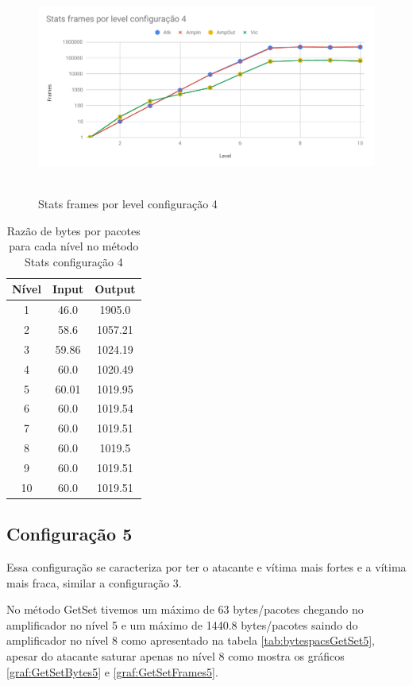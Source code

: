 \begin{figure}[H]
     \centering
     \label{graf:StatsFrames4}
     \includegraphics[scale=0.6]{img/capturas/StatsFLC4.pdf}\
     \caption{Stats frames por level configuração 4}
\end{figure}

\begin{table}[H]
\centering
\label{tab:bytespacsStats4}
\caption{Razão de bytes por pacotes para cada nível no método Stats configuração 4}
\begin{tabular}{|c|c|c|}
\hline
Nível & Input & Output  \\ \hline
1     & 46.0  & 1905.0  \\ \hline
2     & 58.6  & 1057.21 \\ \hline
3     & 59.86 & 1024.19 \\ \hline
4     & 60.0  & 1020.49 \\ \hline
5     & 60.01 & 1019.95 \\ \hline
6     & 60.0  & 1019.54 \\ \hline
7     & 60.0  & 1019.51 \\ \hline
8     & 60.0  & 1019.5  \\ \hline
9     & 60.0  & 1019.51 \\ \hline
10    & 60.0  & 1019.51 \\ \hline
\end{tabular}
\end{table}

\subsection*{Configuração 5}

Essa configuração se caracteriza por ter o atacante e vítima mais fortes e a vítima
mais fraca, similar a configuração 3.

No método GetSet tivemos um máximo de 63 bytes/pacotes chegando no amplificador no nível 5 e um máximo de 1440.8 bytes/pacotes saindo do amplificador no nível 8 como apresentado na tabela \ref{tab:bytespacsGetSet5}, apesar do atacante saturar apenas no nível 8 como mostra os gráficos \ref{graf:GetSetBytes5} e \ref{graf:GetSetFrames5}.

